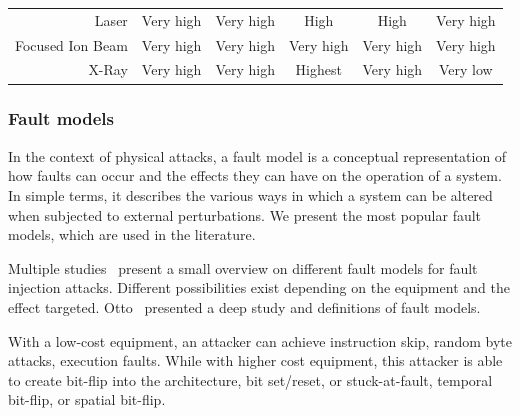 \begin{table}[ht]
\begin{tabular}{@{}rccccc@{}}
        Laser              & Very high                                                                                        & Very high                                                         & High          & High               & Very high                                                      \\
        Focused Ion Beam   & Very high                                                                                        & Very high                                                         & Very high     & Very high          & Very high                                                      \\
        X-Ray              & Very high                                                                                        & Very high                                                         & Highest       & Very high          & Very low                                                       \\
        \bottomrule
    \end{tabular}
\end{table}

\subsubsection{Fault models}
\label{section:soa_fm}
In the context of physical attacks, a fault model is a conceptual representation of how faults can occur and the effects they can have on the operation of a system. In simple terms, it describes the various ways in which a system can be altered when subjected to external perturbations.
We present the most popular fault models, which are used in the literature.

Multiple studies~\cite{BH-22-access,GMA-22-electronics,KSV-13-tvlsi,ZAV-06-jarab,YSW-18-hss} present a small overview on different fault models for fault injection attacks. Different possibilities exist depending on the equipment and the effect targeted. Otto~\cite{O-05-phd} presented a deep study and definitions of fault models.

With a low-cost equipment, an attacker can achieve instruction skip, random byte attacks, execution faults. While with higher cost equipment, this attacker is able to create bit-flip into the architecture, bit set/reset, or stuck-at-fault, temporal bit-flip, or spatial bit-flip.

